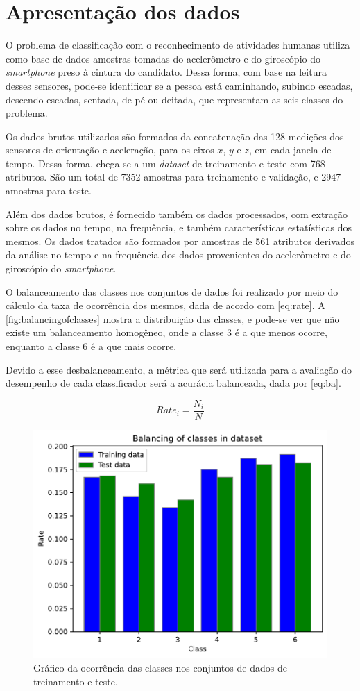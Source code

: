 
\section{Apresentação dos dados}

O problema de classificação com o reconhecimento de atividades humanas utiliza como base de dados amostras tomadas do acelerômetro e do giroscópio do \textit{smartphone} preso à cintura do candidato. Dessa forma, com base na leitura desses sensores, pode-se identificar se a pessoa está caminhando, subindo escadas, descendo escadas, sentada, de pé ou deitada, que representam as seis classes do problema.

Os dados brutos utilizados são formados da concatenação das 128 medições dos sensores de orientação e aceleração, para os eixos $x$, $y$ e $z$, em cada janela de tempo. Dessa forma, chega-se a um \textit{dataset} de treinamento e teste com 768 atributos. São um total de 7352 amostras para treinamento e validação, e 2947 amostras para teste.

Além dos dados brutos, é fornecido também os dados processados, com extração sobre os dados no tempo, na frequência, e também características estatísticas dos mesmos. Os dados tratados são formados por amostras de 561 atributos derivados da análise no tempo e na frequência dos dados provenientes do acelerômetro e do giroscópio do \textit{smartphone}. 

O balanceamento das classes nos conjuntos de dados foi realizado por meio do cálculo da taxa de ocorrência dos mesmos, dada de acordo com \eqref{eq:rate}. A \autoref{fig:balancingofclasses} mostra a distribuição das classes, e pode-se ver que não existe um balanceamento homogêneo, onde a classe 3 é a que menos ocorre, enquanto a classe  6 é a que mais ocorre.

Devido a esse desbalanceamento, a métrica que será utilizada para a avaliação do desempenho de cada classificador será a acurácia balanceada, dada por \eqref{eq:ba}.

\begin{equation}\label{eq:rate}
	Rate_i = \frac{N_i}{N}
\end{equation}

\begin{figure}[H]
	\centering
	\includegraphics[width=0.55\linewidth]{../../plot/Balancing_of_classes}
	\caption{Gráfico da ocorrência das classes nos conjuntos de dados de treinamento e teste.}
	\label{fig:balancingofclasses}
\end{figure}

